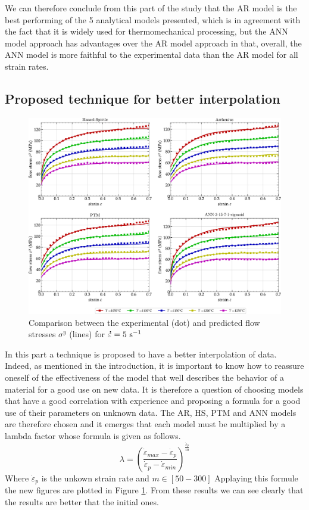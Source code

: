 \documentclass[twoside,english,1p,final,sort&compress]{elsarticle}
\theoremstyle{plain}
\DeclareRobustCommand{\mdot}[1]{\accentset{\mbox{\bfseries .}}{#1}}
\DeclareRobustCommand{\ps}{\text{s}^{-1}}
\begin{document}
We can therefore conclude from this part of the study that the AR model is the best performing of the 5 analytical models presented, which is in agreement with the fact that it is widely used for thermomechanical processing, but the ANN model approach has advantages over the AR model approach in that, overall, the ANN model is more faithful to the experimental data than the AR model for all strain rates.

\subsection{Proposed technique for better interpolation}
\begin{figure}[!ht]
\centering
\includegraphics[width=\columnwidth]
{Figures/Performance}
\caption{Comparison between the experimental (dot) and predicted flow stresses $\sigma^y$ (lines) for $\mdot\varepsilon=5~\ps$}
\label{fig:Performance}
\end{figure}
In this part a technique is proposed to have a better interpolation of data. Indeed, as mentioned in the introduction, it is important to know how to reassure oneself of the effectiveness of the model that well describes the behavior of a material for a good use on new data. It is therefore a question of choosing models that have a good correlation with experience and proposing a formula for a good use of their parameters on unknown data. The AR, HS, PTM and ANN models are therefore chosen and it emerges that each model must be multiplied by a lambda factor whose formula is given as follows.
\begin{equation}
 \lambda = \left(\frac{\dot{\varepsilon}_{max} - \dot{\varepsilon}_{p} }{\dot{\varepsilon}_{p} - \dot{\varepsilon}_{min}}\right)^{\frac{\dot{\varepsilon}_p}{m}}
\end{equation}
Where $\dot{\varepsilon}_{p}$ is the unkown strain rate and $m\in[50-300]$
Applaying this formule the new figures are plotted in Figure \ref{fig:Performance}. From these results we can see clearly that the results are better that the initial ones. 
\end{document}
